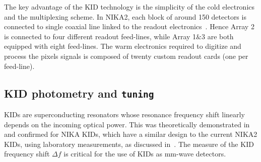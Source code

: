 
The key advantage of the KID technology is the simplicity of the cold
electronics and the multiplexing scheme. In NIKA2, each block of around 150
detectors is connected to single coaxial line linked to the readout
electronics~\citep{Bourrion2016}. {\lp Hence Array 2 is connected to four
different readout feed-lines, while Array 1$\&$3 are both equipped with eight
feed-lines.}
The warm electronics required to digitize
and process the pixels signals is composed of twenty custom readout
cards (one per feed-line).

\subsection{KID photometry and {\tt tuning}}
\label{se:tuning}

KIDs are superconducting resonators whose resonance
frequency shift linearly depends on the incoming optical power.
{\lp This was theoretically demonstrated in~\citet{Swenson2010} and
confirmed for NIKA KIDs, which have a similar design to the current
NIKA2 KIDs, using laboratory measurements, as discussed
in~\citet{Monfardini2014JLTP}.}
The measure of the KID frequency shift $\Delta f$ is critical for the use of
KIDs as mm-wave detectors. 


